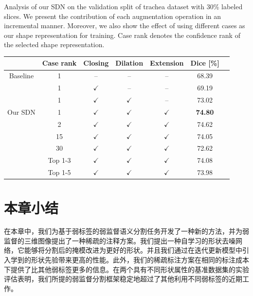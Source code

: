     \begin{table}[t!]
        \centering
        {Analysis of our SDN on the validation split of trachea dataset with 30\% labeled slices. We present the contribution of each augmentation operation in an incremental manner. Moreover, we also show the effect of using different cases as our shape representation for training. Case rank denotes the confidence rank of the selected shape representation.}
        \label{tab:ablation_aug}        
            \begin{tabular}{c c c c c c c}
                \toprule
                & Case rank & Closing     & Dilation     & Extension      & Dice [\%]  \\ \midrule
                Baseline & 1 & --              & --                & --                & 68.39        \\
                & 1 & $\checkmark$    & --                & --                & 69.19         \\ %
                & 1 & $\checkmark$    & $\checkmark$      & --                & 73.02        \\ %
                Our SDN  & 1 & $\checkmark$    & $\checkmark$      & $\checkmark$      & \textbf{74.80}             \\ \midrule
                & 2 & $\checkmark$    & $\checkmark$      & $\checkmark$      & 74.62             \\ 
                & 15 & $\checkmark$    & $\checkmark$      & $\checkmark$      & 74.05             \\ 
                & 30 & $\checkmark$    & $\checkmark$      & $\checkmark$      & 72.62             \\ 
                \midrule
                & Top 1-3 & $\checkmark$    & $\checkmark$      & $\checkmark$      & 74.08             \\
                & Top 1-5 & $\checkmark$    & $\checkmark$      & $\checkmark$      & 73.98             \\
                \bottomrule
            \end{tabular}
    \end{table}






\section{本章小结}
在本章中，我们为基于弱标签的弱监督语义分割任务开发了一种新的方法，并为弱监督的三维图像提出了一种稀疏的注释方案。我们提出一种自学习的形状去噪网络，它能够将分割后的掩模改进为更好的形状。并且我们通过在迭代更新模型中引入学到的形状先验带来更高的性能。此外，我们的稀疏标注方案在相同的标注成本下提供了比其他弱标签更多的信息。在两个具有不同形状属性的基准数据集的实验评估表明，我们所提的弱监督分割框架稳定地超过了其他利用不同弱标签的近期工作。
